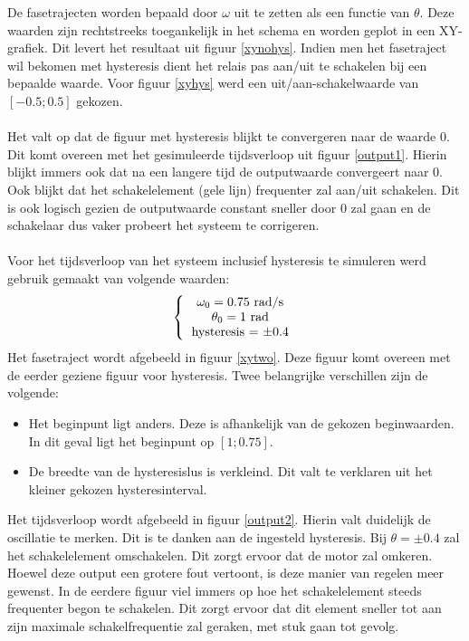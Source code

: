 \documentclass[12pt]{article}
\begin{document}
\noindent De fasetrajecten worden bepaald door $\omega$ uit te zetten als een functie van $\theta$. Deze waarden zijn rechtstreeks toegankelijk in het schema en worden geplot in een XY-grafiek. Dit levert het resultaat uit figuur \ref{xynohys}. Indien men het fasetraject wil bekomen met hysteresis dient het relais pas aan/uit te schakelen bij een bepaalde waarde. Voor figuur \ref{xyhys} werd een uit/aan-schakelwaarde van $[-0.5;0.5]$ gekozen. \\ \\
Het valt op dat de figuur met hysteresis blijkt te convergeren naar de waarde 0. Dit komt overeen met het gesimuleerde tijdsverloop uit figuur \ref{output1}. Hierin blijkt immers ook dat na een langere tijd de outputwaarde convergeert naar 0. Ook blijkt dat het schakelelement (gele lijn) frequenter zal aan/uit schakelen. Dit is ook logisch gezien de outputwaarde constant sneller door 0 zal gaan en de schakelaar dus vaker probeert het systeem te corrigeren. \\ \\
Voor het tijdsverloop van het systeem inclusief hysteresis te simuleren werd gebruik gemaakt van volgende waarden:
\[ 
\left \{
  \begin{tabular}{c}
  $\omega_0 = 0.75$ rad/s \\
  $\theta_0 = 1$ rad \\
  hysteresis = $\pm 0.4$
  \end{tabular}
\right. 
\]
Het fasetraject wordt afgebeeld in figuur \ref{xytwo}. Deze figuur komt overeen met de eerder geziene figuur voor hysteresis. Twee belangrijke verschillen zijn de volgende:
\begin{itemize}
	\item Het beginpunt ligt anders. Deze is afhankelijk van de gekozen beginwaarden. In dit geval ligt het beginpunt op $[1;0.75]$. 
	\item De breedte van de hysteresislus is verkleind. Dit valt te verklaren uit het kleiner gekozen hysteresinterval.
\end{itemize}
Het tijdsverloop wordt afgebeeld in figuur \ref{output2}. Hierin valt duidelijk de oscillatie te merken. Dit is te danken aan de ingesteld hysteresis. Bij $\theta = \pm 0.4$ zal het schakelelement omschakelen. Dit zorgt ervoor dat de motor zal omkeren. Hoewel deze output een grotere fout vertoont, is deze manier van regelen meer gewenst. In de eerdere figuur viel immers op hoe het schakelelement steeds frequenter begon te schakelen. Dit zorgt ervoor dat dit element sneller tot aan zijn maximale schakelfrequentie zal geraken, met stuk gaan tot gevolg. 
\end{document}

